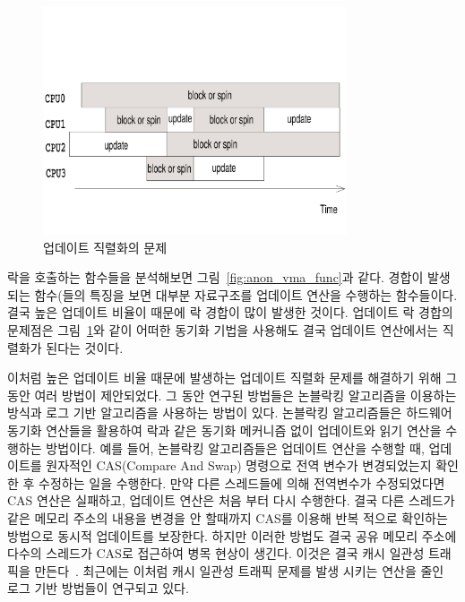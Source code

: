 \begin{figure}[h]
    \centering
    \includegraphics[width=0.8\textwidth]{fig/update}
    \caption{업데이트 직렬화의 문제}
    \label{fig:update}
\end{figure}

락을 호출하는 함수들을 분석해보면 그림~\ref{fig:anon_vma_func}과 같다.
경합이 발생되는 함수(들의 
특징을 보면 대부분 자료구조를 업데이트 연산을 수행하는 함수들이다. 
결국 높은 업데이트 비율이 때문에 락 경합이 많이 발생한 것이다.
업데이트 락 경합의 문제점은 그림~\ref{fig:update}와 같이 어떠한 동기화 기법을 사용해도 
결국 업데이트 연산에서는 직렬화가 된다는 것이다.

이처럼 높은 업데이트 비율 때문에 발생하는 업데이트 직렬화 문제를 해결하기 위해 그 동안 여러 방법이 
제안되었다. 
그 동안 연구된 방법들은 논블락킹 알고리즘을 이용하는 
방식과 로그 기반 알고리즘을 사용하는 방법이 있다.
논블락킹 알고리즘들은 하드웨어 동기화 연산들을 활용하여
락과 같은 동기화 메커니즘 없이 업데이트와 읽기 연산을 수행하는 방법이다.
예를 들어, 논블락킹 알고리즘들은 업데이트 연산을 수행할 때, 업데이트를 원자적인 CAS(Compare And Swap) 
명령으로 전역 변수가 변경되었는지 확인한 후 수정하는 일을 수행한다.
만약 다른 스레드들에 의해 전역변수가 수정되었다면 CAS 연산은 실패하고, 업데이트 연산은 
처음 부터 다시 수행한다. 
결국 다른 스레드가 같은 메모리 주소의 내용을 변경을 안 할때까지 CAS를 이용해 반복 적으로 
확인하는 방법으로 동시적 업데이트를 보장한다. 
하지만 이러한 방법도 결국 공유 메모리 주소에 다수의 스레드가 CAS로 접근하여 병목 현상이 생긴다. 
이것은 결국 캐시 일관성 트래픽을 만든다~\cite{SilasBoydWickizerPth}.
최근에는 이처럼 캐시 일관성 트래픽 문제를 발생 시키는 연산을 줄인 로그 기반 방법들이 연구되고 있다.

